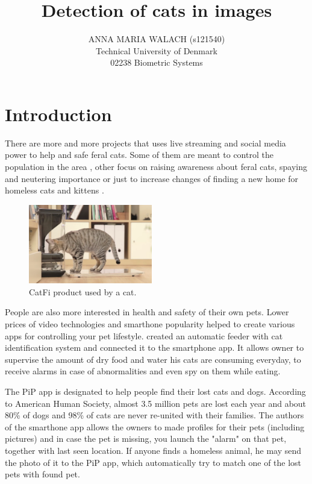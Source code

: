 \documentclass[hyperref]{acmtrans2e}
\title{Detection of cats in images}
\author{ANNA MARIA WALACH (s121540) \\Technical University of Denmark\\02238 Biometric Systems}
\begin{document}
\setcounter{page}{111}

\maketitle

\section{Introduction}
There are more and more projects that uses live streaming and social media power to help and safe feral cats. Some of them are meant to control the population in the area \cite{LAPS:2015}, other focus on raising awareness about feral cats, spaying and neutering importance \cite{TinyKittens:2015} or just to increase changes of finding a new home for homeless cats and kittens \cite{CritterRoom:2015}.
\begin{figure}
\centering
    \includegraphics[width=0.48\textwidth]{bistro}
  \caption{CatFi product used by a cat.}
  \label{fig:bistro}
\end{figure}

People are also more interested in health and safety of their own pets. Lower prices of video technologies and smarthone popularity helped to create various apps for controlling your pet lifestyle. \cite{CatFi:2015} created an automatic feeder with cat identification system and connected it to the smartphone app. It allows owner to supervise the amount of dry food and water his cats are consuming everyday, to receive alarms in case of abnormalities and even spy on them while eating. 

The PiP \cite{PiP:2013} app is designated to help people find their lost cats and dogs. According to American Human Society, almost 3.5 million pets are lost each year and about 80\% of dogs and 98\% of cats are never re-united with their families. The authors of the smarthone app allows the owners to made profiles for their pets (including pictures) and in case the pet is missing, you launch the "alarm" on that pet, together with last seen location. If anyone finds a homeless animal, he may send the photo of it to the PiP app, which automatically try to match one of the lost pets with found pet. 
\end{document}
